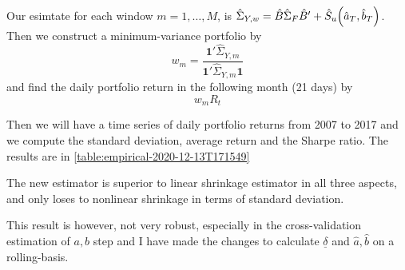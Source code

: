 Our esimtate for each window \(m= 1, \dots,M\), is \(\hat{\Sigma}_{Y,w} = \hat{B}\hat{\Sigma}_{F}\hat{B}' + \hat{S}_{u}\pqty{\hat{a}_{T}, \hat{b}_{T}}\). Then we construct a minimum-variance portfolio by 
\begin{equation*}
    w_{m} = \frac{\mathbf{1}' \hat{\Sigma}_{Y,m}}{ \mathbf{1}' \hat{\Sigma}_{Y,m} \mathbf{1}}
\end{equation*}
and find the daily portfolio return in the following month (21 days) by
\begin{equation*}
    w_{m} R_{t}
\end{equation*}

Then we will have a time series of daily portfolio returns from 2007 to 2017 and we compute the standard deviation, average return and the Sharpe ratio. The results are in \autoref{table:empirical-2020-12-13T171549}



The new estimator is superior to linear shrinkage estimator in all three aspects, and only loses to nonlinear shrinkage in terms of standard deviation. 

This result is however, not very robust, especially in the cross-validation estimation of \(a,b\) step and I have made the changes to calculate \(\underline{\delta}\) and \(\hat{a},\hat{b}\) on a rolling-basis. 